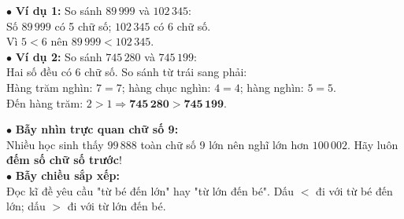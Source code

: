 \documentclass[14pt,a4paper,oneside]{extbook}
\begin{document}
\noindent
\begin{minipage}[t]{0.53\textwidth}
  \begin{tcolorbox}[
    enhanced,
    title={\footnotesize\bfseries\color{white}\faCheckCircle\ Ví dụ thực hành chuẩn mực},
    colback=green!2!white,
    colframe=green!60!black,
    arc=2.5mm, boxrule=0.8pt, top=1.8mm, bottom=1.8mm, left=2.2mm, right=2.2mm
  ]
    \footnotesize
    $\bullet$ \textbf{Ví dụ 1:} So sánh $89\,999$ và $102\,345$:\\
    Số $89\,999$ có 5 chữ số; $102\,345$ có 6 chữ số.\\
    Vì $5 < 6$ nên $89\,999 < 102\,345$.\\
    $\bullet$ \textbf{Ví dụ 2:} So sánh $745\,280$ và $745\,199$:\\
    Hai số đều có 6 chữ số. So sánh từ trái sang phải:\\
    Hàng trăm nghìn: $7 = 7$; hàng chục nghìn: $4 = 4$; hàng nghìn: $5 = 5$.\\
    Đến hàng trăm: $2 > 1 \Rightarrow \mathbf{745\,280 > 745\,199}$.
  \end{tcolorbox}
\end{minipage}%
\hfill
\begin{minipage}[t]{0.45\textwidth}
  \begin{tcolorbox}[
    enhanced,
    title={\footnotesize\bfseries\color{white}\faExclamationTriangle\ Mẹo tránh bẫy trắc nghiệm},
    colback=red!2!white,
    colframe=red!70!black,
    arc=2.5mm, boxrule=0.8pt, top=1.8mm, bottom=1.8mm, left=2.2mm, right=2.2mm
  ]
    \footnotesize
    $\bullet$ \textbf{Bẫy nhìn trực quan chữ số 9:}\\
    Nhiều học sinh thấy $99\,888$ toàn chữ số 9 lớn nên nghĩ lớn hơn $100\,002$. Hãy luôn \textbf{đếm số chữ số trước}!\\
    $\bullet$ \textbf{Bẫy chiều sắp xếp:}\\
    Đọc kĩ đề yêu cầu "từ bé đến lớn" hay "từ lớn đến bé". Dấu $<$ đi với từ bé đến lớn; dấu $>$ đi với từ lớn đến bé.
  \end{tcolorbox}
\end{minipage}
\end{document}
